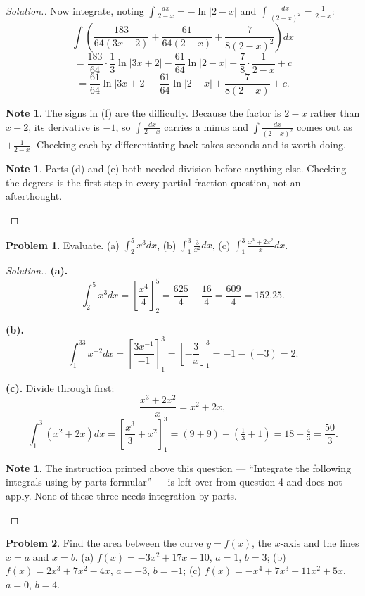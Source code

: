 \documentclass[11pt,a4paper]{article}
\theoremstyle{definition}
\newtheorem{note}[thm]{Note}
\newtheorem{problemx}{Problem}[section]
\newenvironment{problem}{\begin{problemx}}{\end{problemx}}
\newenvironment{solution}
  {\renewcommand{\qedsymbol}{}\begin{proof}[\textit{Solution}.]}
  {\end{proof}}
\begin{document}
\begin{solution}
Now integrate, noting $\int\frac{dx}{2-x}=-\ln|2-x|$ and
$\int\frac{dx}{(2-x)^2}=\frac{1}{2-x}$:
$$\int\left(\frac{183}{64(3x+2)}+\frac{61}{64(2-x)}+\frac{7}{8(2-x)^2}\right)dx$$
$$=\frac{183}{64}\cdot\frac{1}{3}\ln|3x+2|-\frac{61}{64}\ln|2-x|
+\frac{7}{8}\cdot\frac{1}{2-x}+c$$
$$=\frac{61}{64}\ln|3x+2|-\frac{61}{64}\ln|2-x|+\frac{7}{8(2-x)}+c.$$

\begin{note}
The signs in (f) are the difficulty. Because the factor is $2-x$ rather than $x-2$, its
derivative is $-1$, so $\int\frac{dx}{2-x}$ carries a minus and
$\int\frac{dx}{(2-x)^2}$ comes out as $+\frac{1}{2-x}$. Checking each by
differentiating back takes seconds and is worth doing.
\end{note}

\begin{note}
Parts (d) and (e) both needed division before anything else. Checking the degrees is the
first step in every partial-fraction question, not an afterthought.
\end{note}
\end{solution}

\begin{problem}
Evaluate.
\quad (a) $\int_2^5x^3dx$, \quad (b) $\int_1^3\frac{3}{x^2}dx$, \quad
(c) $\int_1^3\frac{x^3+2x^2}{x}dx$.
\end{problem}

\begin{solution}
\textbf{(a).}
$$\int_2^5x^3dx=\left[\frac{x^4}{4}\right]_2^5=\frac{625}{4}-\frac{16}{4}
=\frac{609}{4}=152.25.$$

\textbf{(b).}
$$\int_1^33x^{-2}dx=\left[\frac{3x^{-1}}{-1}\right]_1^3
=\left[-\frac{3}{x}\right]_1^3=-1-(-3)=2.$$

\textbf{(c).} Divide through first:
$$\frac{x^3+2x^2}{x}=x^2+2x,$$
$$\int_1^3\left(x^2+2x\right)dx=\left[\frac{x^3}{3}+x^2\right]_1^3
=\left(9+9\right)-\left(\tfrac{1}{3}+1\right)=18-\tfrac{4}{3}=\frac{50}{3}.$$

\begin{note}
The instruction printed above this question --- ``Integrate the following integrals
using by parts formular'' --- is left over from question 4 and does not apply. None of
these three needs integration by parts.
\end{note}
\end{solution}

\begin{problem}
Find the area between the curve $y=f(x)$, the $x$-axis and the lines $x=a$ and $x=b$.
\quad (a) $f(x)=-3x^2+17x-10$, $a=1$, $b=3$; \quad
(b) $f(x)=2x^3+7x^2-4x$, $a=-3$, $b=-1$; \quad
(c) $f(x)=-x^4+7x^3-11x^2+5x$, $a=0$, $b=4$.
\end{problem}
\end{document}
